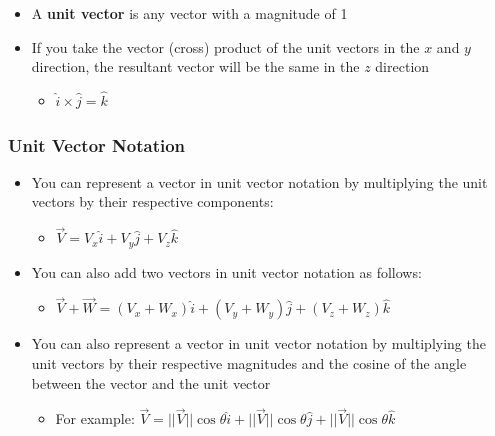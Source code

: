 \documentclass[
  letterpaper,
  DIV=11,
  numbers=noendperiod]{scrartcl}
\providecommand{\tightlist}{%
  \setlength{\itemsep}{0pt}\setlength{\parskip}{0pt}}\usepackage{longtable,booktabs,array}
\begin{document}
\begin{itemize}
\tightlist
\item
  A \textbf{unit vector} is any vector with a magnitude of 1
\item
  If you take the vector (cross) product of the unit vectors in the
  \(x\) and \(y\) direction, the resultant vector will be the same in
  the \(z\) direction

  \begin{itemize}
  \tightlist
  \item
    \(\hat{i} \times \hat{j} = \hat{k}\)
  \end{itemize}
\end{itemize}

\hypertarget{unit-vector-notation}{%
\subsubsection{Unit Vector Notation}\label{unit-vector-notation}}

\begin{itemize}
\tightlist
\item
  You can represent a vector in unit vector notation by multiplying the
  unit vectors by their respective components:

  \begin{itemize}
  \tightlist
  \item
    \(\vec{V} = V_x\hat{i} + V_y\hat{j} + V_z\hat{k}\)
  \end{itemize}
\item
  You can also add two vectors in unit vector notation as follows:

  \begin{itemize}
  \tightlist
  \item
    \(\vec{V} + \vec{W} = (V_x + W_x)\hat{i} + (V_y + W_y)\hat{j} + (V_z + W_z)\hat{k}\)
  \end{itemize}
\item
  You can also represent a vector in unit vector notation by multiplying
  the unit vectors by their respective magnitudes and the cosine of the
  angle between the vector and the unit vector

  \begin{itemize}
  \tightlist
  \item
    For example:
    \(\vec{V} = ||\vec{V}||\cos\theta\hat{i} + ||\vec{V}||\cos\theta\hat{j} + ||\vec{V}||\cos\theta\hat{k}\)
  \end{itemize}
\end{itemize}
\end{document}

